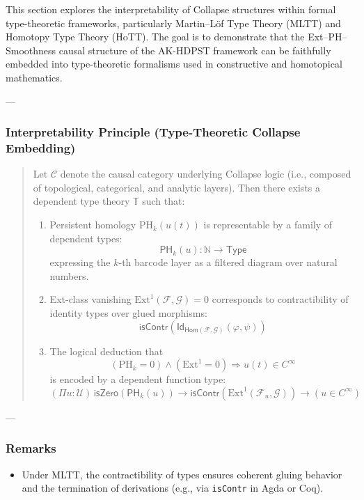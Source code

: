 \documentclass[11pt]{article}
\begin{document}
\begin{axiom}
\begin{axiom}
{{This section explores the interpretability of Collapse structures within formal type-theoretic frameworks,  
particularly Martin--L\"of Type Theory (MLTT) and Homotopy Type Theory (HoTT).  
The goal is to demonstrate that the Ext--PH--Smoothness causal structure of the AK-HDPST framework  
can be faithfully embedded into type-theoretic formalisms used in constructive and homotopical mathematics.

---

\subsubsection*{Interpretability Principle (Type-Theoretic Collapse Embedding)}

\begin{quote}
Let \( \mathcal{C} \) denote the causal category underlying Collapse logic  
(i.e., composed of topological, categorical, and analytic layers).  
Then there exists a dependent type theory \( \mathbb{T} \) such that:
\begin{enumerate}
  \item Persistent homology \( \mathrm{PH}_k(u(t)) \) is representable by a family of dependent types:  
  \[
  \mathsf{PH}_k(u) : \mathbb{N} \to \mathsf{Type}
  \]
  expressing the \(k\)-th barcode layer as a filtered diagram over natural numbers.

  \item Ext-class vanishing \( \mathrm{Ext}^1(\mathcal{F}, \mathcal{G}) = 0 \) corresponds to contractibility of identity types over glued morphisms:  
  \[
  \mathsf{isContr}\left( \mathsf{Id}_{\mathsf{Hom}(\mathcal{F}, \mathcal{G})}(\varphi, \psi) \right)
  \]

  \item The logical deduction that  
  \[
  (\mathrm{PH}_k = 0) \wedge (\mathrm{Ext}^1 = 0) \Rightarrow u(t) \in C^\infty
  \]
  is encoded by a dependent function type:
  \[
  (\Pi u : \mathcal{U})\, \mathsf{isZero}(\mathsf{PH}_k(u)) \to \mathsf{isContr}(\mathrm{Ext}^1(\mathcal{F}_u, \mathcal{G})) \to (u \in C^\infty)
  \]
\end{enumerate}
\end{quote}

---

\subsubsection*{Remarks}

\begin{itemize}
  \item Under MLTT, the contractibility of types ensures coherent gluing behavior and the termination of derivations  
  (e.g., via \texttt{isContr} in Agda or Coq).


\end{itemize}}}
\end{axiom}
\end{axiom}
\end{document}
